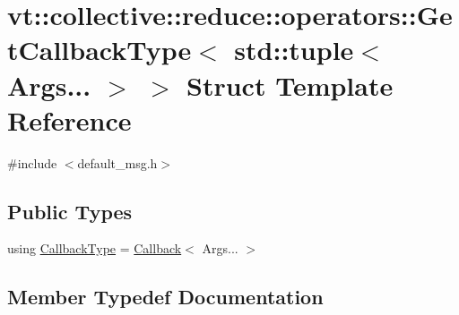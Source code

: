 \hypertarget{structvt_1_1collective_1_1reduce_1_1operators_1_1_get_callback_type_3_01std_1_1tuple_3_01_args_8_8_8_01_4_01_4}{}\section{vt\+:\+:collective\+:\+:reduce\+:\+:operators\+:\+:Get\+Callback\+Type$<$ std\+:\+:tuple$<$ Args... $>$ $>$ Struct Template Reference}
\label{structvt_1_1collective_1_1reduce_1_1operators_1_1_get_callback_type_3_01std_1_1tuple_3_01_args_8_8_8_01_4_01_4}


{\ttfamily \#include $<$default\+\_\+msg.\+h$>$}

\subsection*{Public Types}
\begin{DoxyCompactItemize}
\item 
using \hyperlink{structvt_1_1collective_1_1reduce_1_1operators_1_1_get_callback_type_3_01std_1_1tuple_3_01_args_8_8_8_01_4_01_4_abd4a5d512d6e408672bc49e8f082a245}{Callback\+Type} = \hyperlink{namespacevt_a57b238783d05de96bc2c4027f7073b7f}{Callback}$<$ Args... $>$
\end{DoxyCompactItemize}


\subsection{Member Typedef Documentation}
\mbox{\label{structvt_1_1collective_1_1reduce_1_1operators_1_1_get_callback_type_3_01std_1_1tuple_3_01_args_8_8_8_01_4_01_4_abd4a5d512d6e408672bc49e8f082a245}} 
